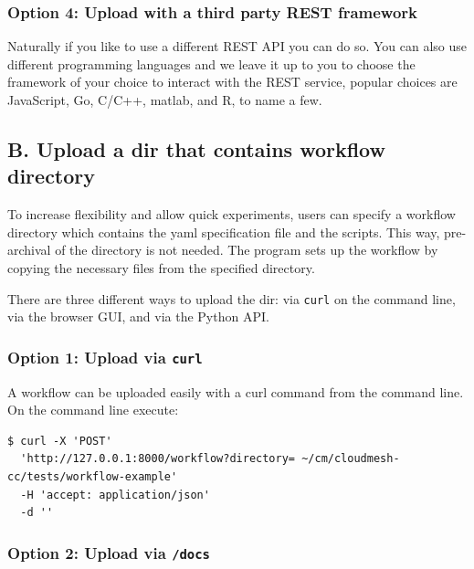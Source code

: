\subsubsection{Option 4: Upload with a third party REST
framework}\label{option-4-upload-with-a-third-party-rest-framework}

Naturally if you like to use a different REST API you can do so. You can
also use different programming languages and we leave it up to you to
choose the framework of your choice to interact with the REST service,
popular choices are JavaScript, Go, C/C++, matlab, and R, to name a few.

\subsection{B. Upload a dir that contains workflow
directory}\label{b.-upload-a-dir-that-contains-workflow-directory}

To increase flexibility and allow quick experiments, users can specify a
workflow directory which contains the yaml specification file and the
scripts. This way, pre-archival of the directory is not needed. The
program sets up the workflow by copying the necessary files from the
specified directory.

There are three different ways to upload the dir: via \texttt{curl} on
the command line, via the browser GUI, and via the Python API.

\subsubsection{\texorpdfstring{Option 1: Upload via
\texttt{curl}}{Option 1: Upload via curl}}\label{option-1-upload-via-curl-1}

A workflow can be uploaded easily with a curl command from the command
line. On the command line execute:

\smallskip
\begin{verbatim}
$ curl -X 'POST' 
  'http://127.0.0.1:8000/workflow?directory= ~/cm/cloudmesh-cc/tests/workflow-example' 
  -H 'accept: application/json' 
  -d ''
\end{verbatim}
\smallskip

\subsubsection{\texorpdfstring{Option 2: Upload via
\texttt{/docs}}{Option 2: Upload via /docs}}\label{option-2-upload-via-docs-1}

